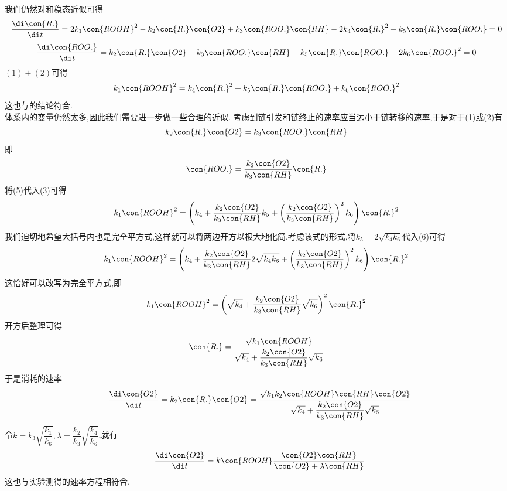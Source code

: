 \documentclass{ctexart}
\begin{document}
\begin{derivation}\setcounter{equation}{0}
    我们仍然对和稳态近似可得
    \begin{equation}
        \dfrac{\di\con{R.}}{\di t}=2k_1\con{ROOH}^2-k_2\con{R.}\con{O2}+k_3\con{ROO.}\con{RH}-2k_4\con{R.}^2-k_5\con{R.}\con{ROO.}=0
    \end{equation}
    \begin{equation}
        \dfrac{\di\con{ROO.}}{\di t}=k_2\con{R.}\con{O2}-k_3\con{ROO.}\con{RH}-k_5\con{R.}\con{ROO.}-2k_6\con{ROO.}^2=0
    \end{equation}
    $(1)+(2)$可得
    \begin{equation}
        k_1\con{ROOH}^2=k_4\con{R.}^2+k_5\con{R.}\con{ROO.}+k_6\con{ROO.}^2
    \end{equation}
    这也与的结论符合.\\
    体系内的变量仍然太多,因此我们需要进一步做一些合理的近似.%
    考虑到链引发和链终止的速率应当远小于链转移的速率,于是对于(1)或(2)有
    \begin{equation}
        k_2\con{R.}\con{O2}=k_3\con{ROO.}\con{RH}
    \end{equation}
    即
    \begin{equation}
        \con{ROO.}=\dfrac{k_2\con{O2}}{k_3\con{RH}}\con{R.}
    \end{equation}
    将(5)代入(3)可得
    \begin{equation}
        k_1\con{ROOH}^2=\left(k_4+\dfrac{k_2\con{O2}}{k_3\con{RH}}k_5+\left(\dfrac{k_2\con{O2}}{k_3\con{RH}}\right)^2k_6\right)\con{R.}^2
    \end{equation}
    我们迫切地希望大括号内也是完全平方式,这样就可以将两边开方以极大地化简.考虑该式的形式,将$k_5=2\sqrt{k_4k_6}$代入(6)可得
    \begin{equation}
        k_1\con{ROOH}^2=\left(k_4+\dfrac{k_2\con{O2}}{k_3\con{RH}}2\sqrt{k_4k_6}+\left(\dfrac{k_2\con{O2}}{k_3\con{RH}}\right)^2k_6\right)\con{R.}^2
    \end{equation}
    这恰好可以改写为完全平方式,即
    \begin{equation}
        k_1\con{ROOH}^2=\left(\sqrt{k_4}+\dfrac{k_2\con{O2}}{k_3\con{RH}}\sqrt{k_6}\right)^2\con{R.}^2
    \end{equation}
    开方后整理可得
    \begin{equation}
        \con{R.}=\dfrac{\sqrt{k_1}\con{ROOH}}{\sqrt{k_4}+\dfrac{k_2\con{O2}}{k_3\con{RH}}\sqrt{k_6}}
    \end{equation}
    于是消耗的速率
    \begin{equation}
        -\dfrac{\di\con{O2}}{\di t}=k_2\con{R.}\con{O2}=\dfrac{\sqrt{k_1}k_2\con{ROOH}\con{RH}\con{O2}}{\sqrt{k_4}+\dfrac{k_2\con{O2}}{k_3\con{RH}}\sqrt{k_6}}
    \end{equation}
    令$k=k_3\sqrt{\dfrac{k_1}{k_6}},\lambda=\dfrac{k_2}{k_3}\sqrt{\dfrac{k_4}{k_6}}$,就有
    \begin{equation}
        -\dfrac{\di\con{O2}}{\di t}=k\con{ROOH}\dfrac{\con{O2}\con{RH}}{\con{O2}+\lambda\con{RH}}
    \end{equation}
    这也与实验测得的速率方程相符合.
\end{derivation}\vspace{8pt}
\end{document}
